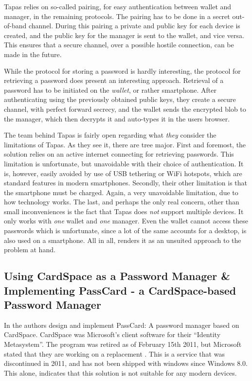 			Tapas relies on so-called pairing, for easy authentication between wallet and manager, in the remaining protocols. The pairing has to be done in a secret out-of-band channel. During this pairing a private and public key for each device is created, and the public key for the manager is sent to the wallet, and vice versa. This ensures that a secure channel, over a possible hostile connection, can be made in the future.

			While the protocol for storing a password is hardly interesting, the protocol for retrieving a password does present an interesting approach. Retrieval of a password has to be initiated on the \emph{wallet}, or rather smartphone. After authenticating using the previously obtained public keys, they create a secure channel, with perfect forward secrecy, and the wallet sends the encrypted blob to the manager, which then decrypts it and auto-types it in the users browser.

			The team behind Tapas is fairly open regarding what \emph{they} consider the limitations of Tapas. As they see it, there are tree major. First and foremost, the solution relies on an active internet connecting for retrieving passwords. This limitation is unfortunate, but unavoidable with their choice of authentication. It is, however, easily avoided by use of USB tethering or WiFi hotspots, which are standard features in modern smartphones. Secondly, their other limitation is that the smartphone must be charged. Again, a very unavoidable limitation, due to how technology works. The last, and perhaps the only real concern, other than small inconveniences is the fact that Tapas does \emph{not} support multiple devices. It only works with \emph{one} wallet and  \emph{one} manager. Even the wallet cannot access these passwords which is unfortunate, since a lot of the same accounts for a desktop, is also used on a smartphone. All in all, renders it as an unsuited approach to the problem at hand.

		\subsection*{Using CardSpace as a Password Manager \& Implementing PassCard - a CardSpace-based Password Manager}
			In \cite{cardspace,cardspace_impl} the authors design and implement PassCard: A password manager based on CardSpace. CardSpace was Microsoft's client software for their ``Identity Metasystem''. The program was retired as of February 15th 2011, but Microsoft stated that they are working on a replacement \cite{cardspace_cancelled}. This is a service that was discontinued in 2011, and has not been shipped with windows since Windows 8.0. This alone, indicates that this solution is not suitable for any modern devices.

